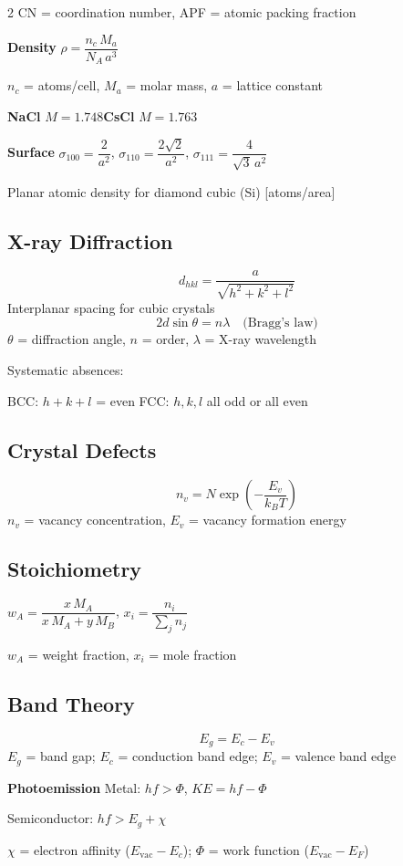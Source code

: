 \documentclass[9pt]{extarticle}
\newcommand{\eqlabel}[1]{\textbf{\scriptsize #1}\;}
\newcommand{\desc}[1]{{\small\color{desc}#1}}
\begin{document}
\begin{multicols}{2}
\desc{CN = coordination number, APF = atomic packing fraction}

\smallskip
\eqlabel{Density} $\rho = \dfrac{n_c\,M_a}{N_A\,a^3}$

\desc{$n_c$ = atoms/cell, $M_a$ = molar mass, $a$ = lattice constant}

\eqlabel{NaCl} $M = 1.748$\quad \eqlabel{CsCl} $M = 1.763$

\eqlabel{Surface} $\sigma_{100} = \dfrac{2}{a^2}$, \; $\sigma_{110} = \dfrac{2\sqrt{2}}{a^2}$, \; $\sigma_{111} = \dfrac{4}{\sqrt{3}\,a^2}$

\desc{Planar atomic density for diamond cubic (Si) [atoms/area]}

\subsection{X-ray Diffraction}
\[d_{hkl} = \frac{a}{\sqrt{h^2+k^2+l^2}}\]
\desc{Interplanar spacing for cubic crystals}
\[2d\sin\theta = n\lambda \quad\text{(Bragg's law)}\]
\desc{$\theta$ = diffraction angle, $n$ = order, $\lambda$ = X-ray wavelength}

Systematic absences:

BCC: $h\!+\!k\!+\!l$ = even \quad FCC: $h,k,l$ all odd or all even

\subsection{Crystal Defects}
\[n_v = N\exp\!\left(-\frac{E_v}{k_BT}\right)\]
\desc{$n_v$ = vacancy concentration, $E_v$ = vacancy formation energy}

\subsection{Stoichiometry}
$w_A = \dfrac{x\,M_A}{x\,M_A + y\,M_B}$, \quad $x_i = \dfrac{n_i}{\sum_j n_j}$

\desc{$w_A$ = weight fraction, $x_i$ = mole fraction}

\subsection{Band Theory}
\[E_g = E_c - E_v\]
\desc{$E_g$ = band gap; $E_c$ = conduction band edge; $E_v$ = valence band edge}

\eqlabel{Photoemission}
Metal: $hf > \Phi$, \; $KE = hf - \Phi$

Semiconductor: $hf > E_g + \chi$

\desc{$\chi$ = electron affinity ($E_{\text{vac}} - E_c$); $\Phi$ = work function ($E_{\text{vac}} - E_F$)}


\end{multicols}
\end{document}
